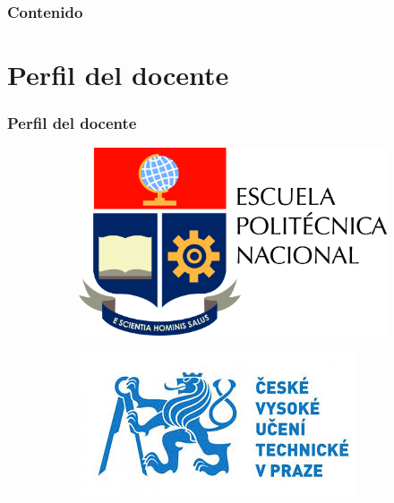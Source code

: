 \documentclass[xcolor=dvipsnames,envcountsect]{beamer}
\begin{document}
\begin{frame}{\titlepage}\end{frame}
\begin{frame}{\frametitle{Contenido}\tableofcontents}\end{frame}


\section{Perfil del docente}
\begin{frame}
	\frametitle{Perfil del docente}
		\justifying
		
\begin{figure}
     \centering
     \begin{subfigure}[b]{0.3\textwidth}
         \centering
         \includegraphics[width=\textwidth]{Figures/epn.jpg}
     \end{subfigure}
     \hfill
     \begin{subfigure}[b]{0.3\textwidth}
         \centering
         \includegraphics[width=\textwidth]{Figures/cvut.jpg}

\end{subfigure}
\end{figure}
\end{frame}
\end{document}
